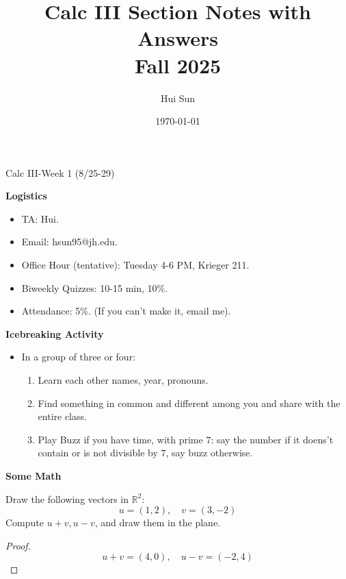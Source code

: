 \documentclass[openany]{book}
\title{Calc III Section Notes with Answers
\\ 
\vspace{0.4cm}
\large Fall 2025}
\date{\today}
\author{Hui Sun}
\newcommand{\R}{\mathbb{R}}
\begin{document}
\maketitle

\newpage


\begin{center}
    \Large Calc III-Week 1 (8/25-29)
\end{center}

\renewcommand\thesection{\arabic{section}}

\textbf{Logistics}


\begin{itemize}
    \item TA: Hui.
    \item Email: hsun95@jh.edu.
    \item Office Hour (tentative): Tuesday 4-6 PM, Krieger 211.
    \item Biweekly Quizzes: 10-15 min, 10\%.
    \item Attendance: 5\%. (If you can't make it, email me).
\end{itemize}

\textbf{Icebreaking Activity}

\begin{itemize}
    \item In a group of three or four: 
    \begin{enumerate}
        \item Learn each other names, year, pronouns.
        \item Find something in common and different among you and share with the entire class.
        \item Play Buzz if you have time, with prime $7$: say the number if it doens't contain or is not divisible by $7$, say buzz otherwise.
    \end{enumerate}
\end{itemize}


\textbf{Some Math}
\begin{prob}
    Draw the following vectors in $\R^2$:
    \begin{equation*}
        u=(1,2), \quad v=(3,-2)
    \end{equation*}
    Compute $u+v, u-v$, and draw them in the plane.
\end{prob}
\begin{proof}
    \begin{equation*}
        u+v=(4,0), \quad u-v=(-2, 4)
    \end{equation*}
\end{proof}
\end{document}
